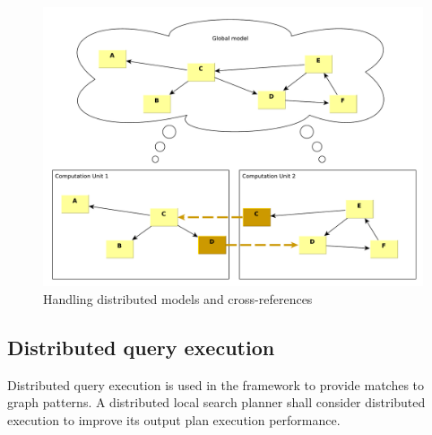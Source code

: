 \begin{figure}[h]
	\begin{center}
		\includegraphics[width=\textwidth]{figures/distributed-model-handling.pdf}
		\caption{Handling distributed models and cross-references}
		\label{fig:distributed-model-handling}
	\end{center}
\end{figure}



\subsection{Distributed query execution}

Distributed query execution is used in the framework to provide matches to graph patterns. 
A distributed local search planner shall consider distributed execution to improve its output plan execution performance.







